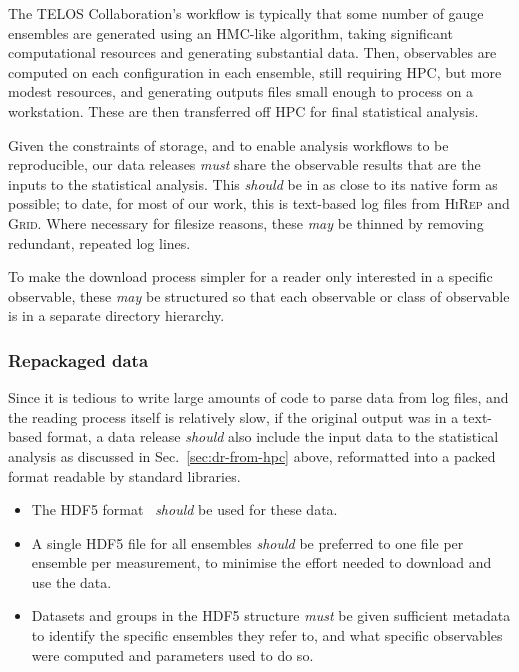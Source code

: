\documentclass{article}
\newcommand\rfcword[1]{\emph{#1}\xspace}
\newcommand\must{\rfcword{must}}
\newcommand\should{\rfcword{should}}
\newcommand\may{\rfcword{may}}
\newcommand\program[1]{\textsc{#1}\xspace}
\begin{document}
The TELOS Collaboration's workflow is typically that
some number of gauge ensembles are generated using an HMC-like algorithm,
taking significant computational resources
and generating substantial data.
Then,
observables are computed on each configuration in each ensemble,
still requiring HPC,
but more modest resources,
and generating outputs files small enough to process on a workstation.
These are then transferred off HPC for final statistical analysis.

Given the constraints of storage,
and to enable analysis workflows to be reproducible,
our data releases \must
share the observable results that are the inputs to the statistical analysis.
This \should be in as close to its native form as possible;
to date,
for most of our work,
this is text-based log files from \program{HiRep} and \program{Grid}.
Where necessary for filesize reasons,
these \may be thinned by removing redundant, repeated log lines.

To make the download process simpler for a reader only interested in a specific observable,
these \may be structured so that
each observable or class of observable
is in a separate directory hierarchy.


\subsubsection{Repackaged data}

Since it is tedious to write large amounts of code to parse data from log files,
and the reading process itself is relatively slow,
if the original output was in a text-based format,
a data release \should also include the input data to the statistical analysis
as discussed in Sec.~\ref{sec:dr-from-hpc} above,
reformatted into a packed format readable by standard libraries.

\begin{itemize}
  \item
        The HDF5 format~\cite{hdf5} \should be used for these data.
  \item
        A single HDF5 file for all ensembles \should be preferred
        to one file per ensemble per measurement,
        to minimise the effort needed to download and use the data.
  \item
        Datasets and groups in the HDF5 structure \must be given
        sufficient metadata to identify the specific ensembles they refer to,
        and what specific observables were computed and parameters used to do so.
\end{itemize}
\end{document}
